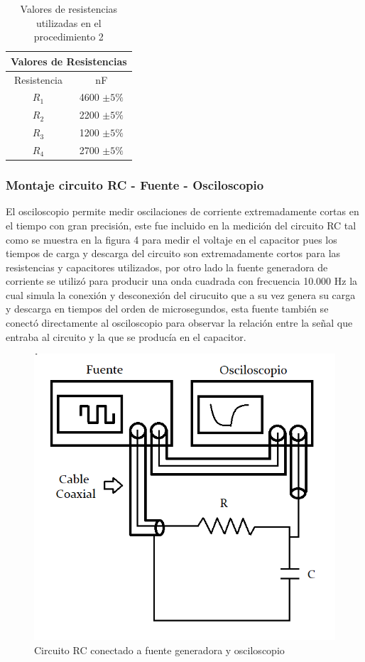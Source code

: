 \documentclass[10pt,letter]{article}
\begin{document}
\begin{multicols}{2}
\begin{table}[H]
\centering
\begin{tabular}{|c|c|}
\hline
\multicolumn{2}{|l|}{Valores de Resistencias} \\ \hline
Resistencia & nF \\ \hline
$R_1$ & 4600 $\pm 5\%$ \\ \hline
$R_2$ & 2200 $\pm 5\%$ \\ \hline
$R_3$ & 1200 $\pm 5\%$ \\ \hline
$R_4$ & 2700 $\pm 5\%$ \\ \hline
\end{tabular}
\caption{Valores de resistencias utilizadas en el procedimiento 2}
\end{table}

\subsubsection{Montaje circuito RC - Fuente - Osciloscopio}

El osciloscopio permite medir oscilaciones de corriente extremadamente cortas en el tiempo con gran precisión, este fue incluido en la medición del circuito RC tal como se muestra en la figura 4 para medir el voltaje en el capacitor pues los tiempos de carga y descarga del circuito son extremadamente cortos para las resistencias y capacitores utilizados, por otro lado la fuente generadora de corriente se utilizó para producir una onda cuadrada con frecuencia 10.000 Hz la cual simula la conexión y desconexión del cirucuito que a su vez genera su carga y descarga en tiempos del orden de microsegundos, esta fuente también se conectó directamente al osciloscopio para observar la relación entre la señal que entraba al circuito y la que se producía en el capacitor.

\begin{figure}[H]
\centering
\includegraphics[scale=0.4]{Circuito}
\caption{Circuito RC conectado a fuente generadora y osciloscopio}
\label{RCcarga}
\end{figure}



\end{multicols}
\end{document}
